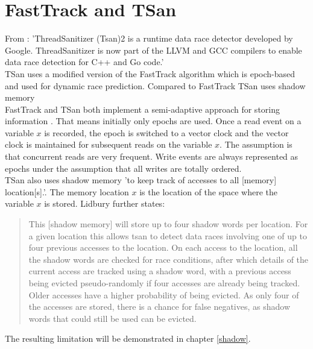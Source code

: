 \documentclass[12pt]{article}
\begin{document}
	\section{FastTrack and TSan}\label{fasttrack-sec}
	From \cite[p. 183]{lin}: 'ThreadSanitizer (Tsan)2 is a runtime data race detector developed by Google. ThreadSanitizer is now part of the LLVM and GCC compilers to enable data race detection for C++ and Go code.'\\
	TSan uses a modified version of the FastTrack algorithm which is epoch-based and used for dynamic race prediction. Compared to FastTrack TSan uses shadow memory \cite[p. 183]{lin}\cite[p. 4]{yu}\\
	FastTrack and TSan both implement a semi-adaptive approach for storing information \cite[p. 10]{sulzmann2}. That means initially only epochs are used. Once a read event on a variable $x$ is recorded, the epoch is switched to a vector clock and the vector clock is maintained for subsequent reads on the variable $x$. The assumption is that concurrent reads are very frequent. Write events are always represented as epochs under the assumption that all writes are totally ordered.\\
	TSan also uses shadow memory 'to keep track of accesses to all [memory] location[s].'\cite[p. 4]{lidbury}. The memory location $x$ is the location of the space where the variable $x$ is stored. Lidbury further states:
	\begin{quote}
		This [shadow memory] will store up to four shadow words per location. For a given location this allows tsan to detect data races involving one of up to four previous accesses to the location. On each access to the location, all the shadow words are checked for race conditions, after which details of the current access are tracked using a shadow word, with a previous access being evicted pseudo-randomly if four accesses are already being tracked. Older accesses have a higher probability of being evicted. As only four of the accesses are stored, there is a chance for false negatives, as shadow words that could still be used can be evicted.
	\end{quote}
	The resulting limitation will be demonstrated in chapter \ref{shadow}.
\end{document}
